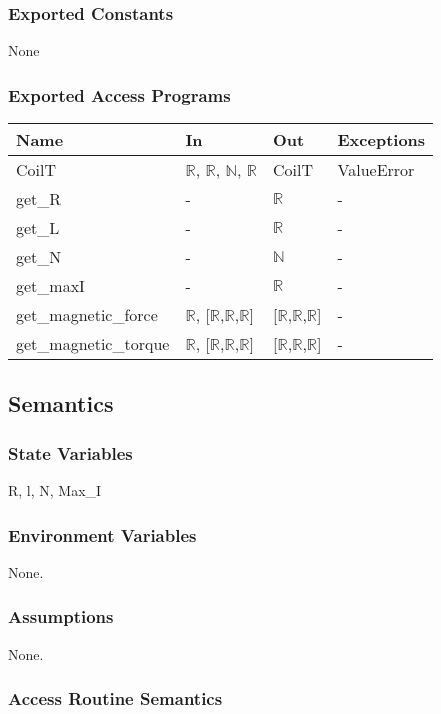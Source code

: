 \documentclass[12pt, titlepage]{article}
\begin{document}
\subsubsection{Exported Constants}
None
\subsubsection{Exported Access Programs}

\begin{center}
\begin{tabular}{p{4cm} p{4cm} p{4cm} p{2cm}}
\hline
\textbf{Name} & \textbf{In} & \textbf{Out} & \textbf{Exceptions} \\
\hline
CoilT & $\mathbb{R}$, $\mathbb{R}$, $\mathbb{N}$, $\mathbb{R}$ & CoilT  & ValueError \\
\hline
get\_R & - & $\mathbb{R}$  & -  \\
\hline
get\_L & - & $\mathbb{R}$  & -  \\
\hline
get\_N & - & $\mathbb{N}$  & -  \\
\hline
get\_maxI & - & $\mathbb{R}$  & -  \\
\hline
get\_magnetic\_force & $\mathbb{R}$, [$\mathbb{R}$,$\mathbb{R}$,$\mathbb{R}$] & [$\mathbb{R}$,$\mathbb{R}$,$\mathbb{R}$]  & -  \\
\hline
get\_magnetic\_torque & $\mathbb{R}$, [$\mathbb{R}$,$\mathbb{R}$,$\mathbb{R}$] & [$\mathbb{R}$,$\mathbb{R}$,$\mathbb{R}$]  & -  \\
\hline
\end{tabular}
\end{center}

\subsection{Semantics}

\subsubsection{State Variables}
R, l, N, Max\_I
\subsubsection{Environment Variables}
None.
\subsubsection{Assumptions}
None.

\subsubsection{Access Routine Semantics}
\end{document}
